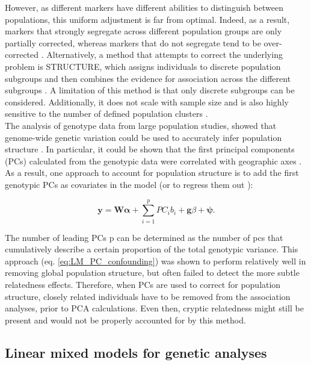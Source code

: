 However, as different markers have different abilities to distinguish between populations, this uniform adjustment is far from optimal. 
Indeed, as a result, markers that strongly segregate across different population groups are only partially corrected, whereas markers that do not segregate tend to be over-corrected \cite{marchini2004effects, price2006principal}.
Alternatively, a method that attempts to correct the underlying problem is STRUCTURE, which assigns individuals to discrete population subgroups and then combines the evidence for association across the different subgroups \cite{pritchard2000inference}. 
A limitation of this method is that only discrete subgroups can be considered. 
Additionally, it does not scale with sample size and is also highly sensitive to the number of defined population clusters \cite{price2006principal}.\\

The analysis of genotype data from large population studies, showed that genome-wide genetic variation could be used to
accurately infer population structure \cite{li2008worldwide, tian2008analysis, price2008discerning}.
In particular, it could be shown that the first principal components (PCs) calculated from the genotypic data were correlated with geographic axes \cite{novembre2008interpreting}.
As a result, one approach to account for population structure is to add the first genotypic PCs as covariates in the model (or to regress them out \cite{price2006principal}): 

\begin{equation}\label{eq:LM_PC_confounding}
    \mathbf{y} =  \mathbf{W}\boldsymbol{\alpha} + \sum_{i=1}^{p} PC_i b_i + \mathbf{g}\beta + \boldsymbol{\psi}. 
\end{equation}

The number of leading PCs p can be determined as the number of \gls{pc}s that cumulatively describe a certain proportion of the total genotypic variance.
This approach (eq. \eqref{eq:LM_PC_confounding}) was shown to perform relatively well in removing global population structure, but often failed to detect the more subtle relatedness effects.
Therefore, when PCs are used to correct for population structure, closely related individuals have to be removed from the association analyses, prior to PCA calculations.
Even then, cryptic relatedness might still be present and would not be properly accounted for by this method. 

\subsection{Linear mixed models for genetic analyses}
\label{sec:LMM}

